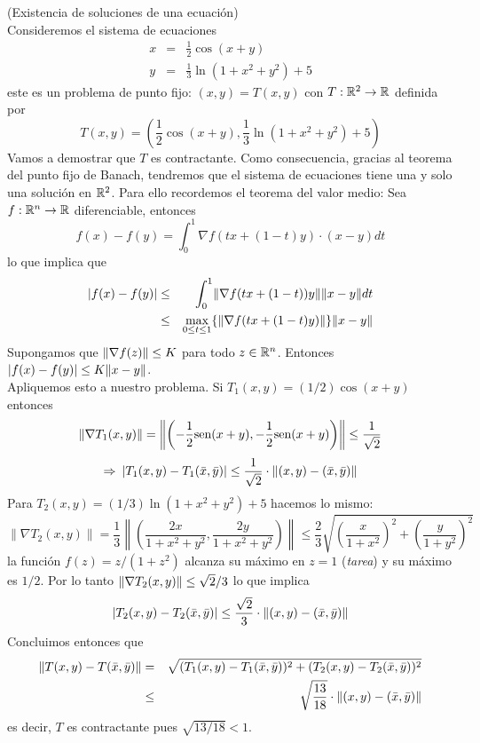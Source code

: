 \begin{ejemplo}{\rm (Existencia de soluciones de una ecuaci\'on) }
\\Consideremos el sistema de ecuaciones
\begin{eqnarray*}
x&=& \frac{1}{2}\cos(x+y) \\ 
y&=& \frac{1}{3}\ln (1+x^2+y^2) +5
\end{eqnarray*}
este es un problema de punto fijo: $(x,y)=T(x,y)$ con $T:\mathbb{R}^2\to \mathbb{R}$ definida por 
\[T(x,y)=\left(\frac{1}{2}\cos(x+y),\frac{1}{3}\ln (1+x^2+y^2)+5\right)\] 
Vamos a demostrar que $T$ es contractante. Como consecuencia, gracias al teorema del punto fijo de Banach, tendremos que el sistema de ecuaciones tiene una y solo una soluci\'on en $\mathbb{R}^2$. Para ello recordemos el teorema del valor medio: Sea $f:\mathbb{R}^n\to \mathbb{R}$ diferenciable, entonces
\[f(x)-f(y)=\int_0^1\nabla f(tx+(1-t)y)\cdot (x-y)dt\]
lo que implica que
\begin{eqnarray*}
|f(x)-f(y)| & \leq & \int_0^1\lVert\nabla f(tx+(1-t))y\rVert\lVert x-y\rVert dt \\ 
			& \leq & \max_{0\leq t\leq 1}\{\lVert\nabla f(tx+(1-t)y)\rVert\}\lVert x-y\rVert
\end{eqnarray*}
Supongamos que $\lVert\nabla f(z)\rVert\leq K$ para todo $z\in \mathbb{R}^n$. Entonces $|f(x)-f(y)|\leq K\lVert x-y\rVert$.
\\Apliquemos esto a nuestro problema. Si $T_1(x,y)=(1/2)\cos(x+y)$ entonces
\[\|\nabla T_1(x,y) \| = \left\|\left(-\frac{1}{2}\text{sen}(x+y),-\frac{1}{2}\text{sen}(x+y)\right)\right\| \leq \frac{1}{\sqrt{2}}\]
\[\Rightarrow\:|T_1(x,y)-T_1(\bar x,\bar y)|\leq\frac{1}{\sqrt{2}}\cdot \lVert(x,y)-(\bar x,\bar y)\rVert\]
Para $T_2(x,y)=(1/3)\ln (1+x^2+y^2) +5$ hacemos lo mismo:
\[\|\nabla T_2(x,y)\| = \frac{1}{3}\left\|\left(\frac{2x}{1+x^2+y^2},\frac{2y}{1+x^2+y^2}\right)\right\| \leq \frac{2}{3}\sqrt{\left(\frac{x}{1+x^2}\right)^2+\left(\frac{y}{1+y^2}\right)^2}\] 
la funci\'on $f(z)=z/(1+z^2)$ alcanza su m\'aximo en $z=1$ (\emph{tarea}) y su m\'aximo es $1/2$. Por lo tanto $\lVert\nabla T_2(x,y)\rVert\leq \sqrt{2}/3$ lo que implica 
\[|T_2(x,y)-T_2(\bar x,\bar y)|\leq\frac{\sqrt{2}}{3}\cdot \lVert(x,y)-(\bar x,\bar y)\rVert\]
Concluimos entonces que 
\begin{eqnarray*}
\lVert T(x,y)-T(\bar x,\bar y)\rVert& =   & \sqrt{(T_1(x,y)-T_1(\bar x,\bar y))^2+(T_2(x,y)-T_2(\bar x,\bar y))^2} \\
							  &\leq & \sqrt{\frac{13}{18}}\cdot \lVert(x,y)-(\bar x,\bar y)\rVert
\end{eqnarray*}
es decir, $T$ es contractante pues $\sqrt{13/18}<1$. 
\end{ejemplo}


